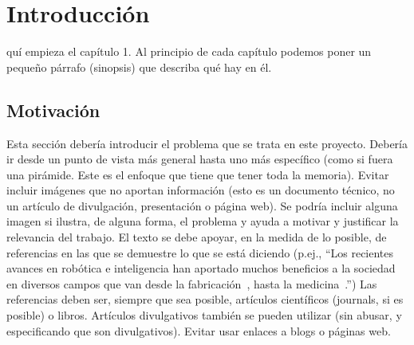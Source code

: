 \documentclass[a4paper,11pt,leqno, twoside]{memoir}
\begin{document}


\frontmatter
{}


%
%

\clearemptydoublepage
%

\clearemptydoublepage
%

\clearemptydoublepage
%

\clearemptydoublepage
%

\clearemptydoublepage
%

\clearemptydoublepage
%

\dominitoc
{\sffamily\tableofcontents*}
\clearemptydoublepage
%
{\sffamily\listoffigures}\mtcaddchapter
\clearemptydoublepage
%
{\sffamily\listoftables}\mtcaddchapter
\clearpage


%
%
\mainmatter

\chapter{Introducción}
\label{cap:introduccion}
\minitoc
\vspace{1cm}
quí empieza el capítulo 1. Al principio de cada capítulo podemos poner un pequeño párrafo (sinopsis) que describa qué hay en él.
\newpage

\section{Motivación}
\label{sec:motivacion}

Esta sección debería introducir el problema que se trata en este proyecto. Debería ir desde un punto de vista más general hasta uno más específico (como si fuera una pirámide. Este es el enfoque que tiene que tener toda la memoria). Evitar incluir imágenes que no aportan información (esto es un documento técnico, no un artículo de divulgación, presentación o página web). Se podría incluir alguna imagen si ilustra, de alguna forma, el problema y ayuda a motivar y justificar la relevancia del trabajo. El texto se debe apoyar, en la medida de lo posible, de referencias en las que se demuestre lo que se está diciendo (p.ej., ``Los recientes avances en robótica e inteligencia han aportado muchos beneficios a la sociedad en diversos campos que van desde la fabricación~\cite{ajoudani2018progress}, hasta la medicina~\cite{malik2019overview}.'') Las referencias deben ser, siempre que sea posible, artículos científicos (journals, si es posible) o libros. Artículos divulgativos también se pueden utilizar (sin abusar, y especificando que son divulgativos). Evitar usar enlaces a blogs o páginas web.
\end{document}
